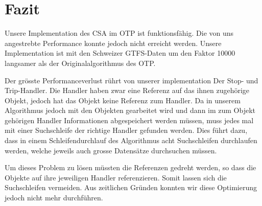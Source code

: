 \section{Fazit}
Unsere Implementation des CSA im OTP ist funktionsfähig. Die von uns angestrebte Performance konnte jedoch nicht erreicht werden. Unsere Implementation ist mit den Schweizer GTFS-Daten um den Faktor 10000 langsamer als der Originalalgorithmus des OTP.

Der grösste Performanceverlust rührt von unserer implementation Der Stop- und Trip-Handler. Die Handler haben zwar eine Referenz auf das ihnen zugehörige Objekt, jedoch hat das Objekt keine Referenz zum Handler. Da in unserem Algorithmus jedoch mit den Objekten gearbeitet wird und dann im zum Objekt gehörigen Handler Informationen abgespeichert werden müssen, muss jedes mal mit einer Suchschleife der richtige Handler gefunden werden. Dies führt dazu, dass in einem Schleifendurchlauf des Algorithmus acht Suchschleifen durchlaufen werden, welche jeweils auch grosse Datensätze durchsuchen müssen. 

Um dieses Problem zu lösen müssten die Referenzen gedreht werden, so dass die Objekte auf ihre jeweiligen Handler referenzieren. Somit lassen sich die Suchschleifen vermeiden. Aus zeitlichen Gründen konnten wir diese Optimierung jedoch nicht mehr durchführen.

